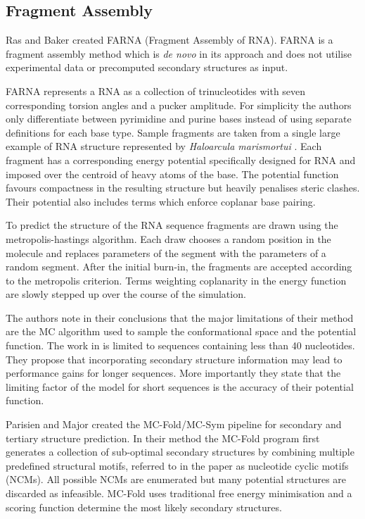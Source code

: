 \documentclass[journal]{IEEEtran}
\begin{document}
\subsection{Fragment Assembly}
\label{subsec:fragment-assembly}

Ras and Baker \cite{das2007automated} created FARNA (Fragment Assembly of RNA). FARNA is a fragment assembly method which is \textit{de novo} in its approach and does not utilise experimental data or precomputed secondary structures as input.

FARNA represents a RNA as a collection of trinucleotides with seven corresponding torsion angles and a pucker amplitude. For simplicity the authors only differentiate between pyrimidine and purine bases instead of using separate definitions for each base type. Sample fragments are taken from a single large example of RNA structure represented by \textit{Haloarcula marismortui} \cite{ban2000complete}. Each fragment has a corresponding energy potential specifically designed for RNA and imposed over the centroid of heavy atoms of the base. The potential function favours compactness in the resulting structure but heavily penalises steric clashes. Their potential also includes terms which enforce coplanar base pairing. 

To predict the structure of the RNA sequence fragments are drawn using the metropolis-hastings algorithm. Each draw chooses a random position in the molecule and replaces parameters of the segment with the parameters of a random segment. After the initial burn-in, the fragments are accepted according to the metropolis criterion. Terms weighting coplanarity in the energy function are slowly stepped up over the course of the simulation.

The authors note in their conclusions that the major limitations of their method are the MC algorithm used to sample the conformational space and the potential function. The work in \cite{das2007automated} is limited to sequences containing less than 40 nucleotides. They propose that incorporating secondary structure information may lead to performance gains for longer sequences. More importantly they state that the limiting factor of the model for short sequences is the accuracy of their potential function.

Parisien and Major\cite{parisien2008mc} created the MC-Fold/MC-Sym pipeline for secondary and tertiary structure prediction. In their method the MC-Fold program first generates a collection of sub-optimal secondary structures by combining multiple predefined structural motifs, referred to in the paper as nucleotide cyclic motifs (NCMs). All possible NCMs are enumerated but many potential structures are discarded as infeasible. MC-Fold uses traditional free energy minimisation and a scoring function determine the most likely secondary structures.
\end{document}
